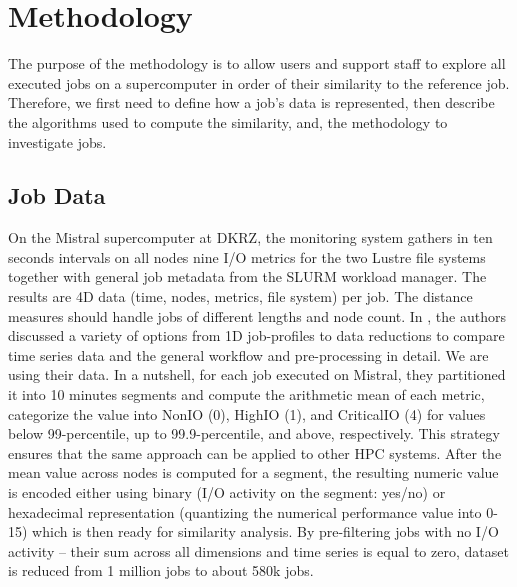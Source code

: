 \documentclass{jhps}
\begin{document}
\section{Methodology}
\label{sec:methodology}

The purpose of the methodology is to allow users and support staff to explore all executed jobs on a supercomputer in order of their similarity to the reference job.
Therefore, we first need to define how a job's data is represented, then describe the algorithms used to compute the similarity, and, the methodology to investigate jobs.

\subsection{Job Data}
On the Mistral supercomputer at DKRZ, the monitoring system \cite{betke20} gathers in ten seconds intervals on all nodes nine I/O metrics for the two Lustre file systems together with general job metadata from the SLURM workload manager.
The results are 4D data (time, nodes, metrics, file system) per job.
The distance measures should handle jobs of different lengths and node count.
In \cite{Eugen20HPS}, the authors discussed a variety of options from 1D job-profiles to data reductions to compare time series data and the general workflow and pre-processing in detail. We are using their data.
In a nutshell, for each job executed on Mistral, they partitioned it into 10 minutes segments and compute the arithmetic mean of each metric, categorize the value into NonIO (0), HighIO (1), and CriticalIO (4) for values below 99-percentile, up to 99.9-percentile, and above, respectively.
This strategy ensures that the same approach can be applied to other HPC systems.
After the mean value across nodes is computed for a segment, the resulting numeric value is encoded either using binary (I/O activity on the segment: yes/no) or hexadecimal representation (quantizing the numerical performance value into 0-15) which is then ready for similarity analysis.
By pre-filtering jobs with no I/O activity -- their sum across all dimensions and time series is equal to zero, dataset is reduced from 1 million jobs to about 580k jobs.
\end{document}
